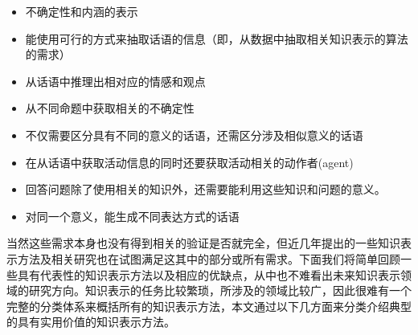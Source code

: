 \begin{itemize}
\item 不确定性和内涵的表示
\item 能使用可行的方式来抽取话语的信息（即，从数据中抽取相关知识表示的算法的需求）  
\item 从话语中推理出相对应的情感和观点
\item 从不同命题中获取相关的不确定性
\item 不仅需要区分具有不同的意义的话语，还需区分涉及相似意义的话语
\item 在从话语中获取活动信息的同时还要获取活动相关的动作者(agent)
\item 回答问题除了使用相关的知识外，还需要能利用这些知识和问题的意义。
\item 对同一个意义，能生成不同表达方式的话语
\end{itemize}

当然这些需求本身也没有得到相关的验证是否就完全，但近几年提出的一些知识表示方法及相关研究也在试图满足这其中的部分或所有需求。下面我们将简单回顾一些具有代表性的知识表示方法以及相应的优缺点，从中也不难看出未来知识表示领域的研究方向。知识表示的任务比较繁琐，所涉及的领域比较广，因此很难有一个完整的分类体系来概括所有的知识表示方法，本文通过以下几方面来分类介绍典型的具有实用价值的知识表示方法。

